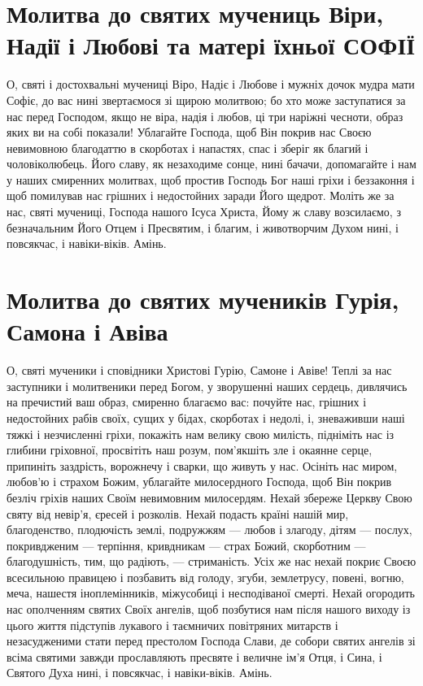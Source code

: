 \documentclass[chapters.tex]{subfiles}
\begin{document}
\section{Молитва до святих мучениць Віри, Надії і Любові та матері їхньої СОФІЇ}
О, святі і достохвальні мучениці Віро, Надіє і Любове і мужніх дочок мудра мати Софіє, до вас нині звертаємося зі щирою молитвою; бо хто може заступатися за нас перед Господом, якщо не віра, надія і любов, ці три наріжні чесноти, образ яких ви на собі показали! Ублагайте Господа, щоб Він покрив нас Своєю невимовною благодаттю в скорботах і напастях, спас і зберіг як благий і чоловіколюбець. Його славу, як незаходиме сонце, нині бачачи, допомагайте і нам у наших смиренних молитвах, щоб простив Господь Бог наші гріхи і беззаконня і щоб помилував нас грішних і недостойних заради Його щедрот. Моліть же за нас, святі мучениці, Господа нашого Ісуса Христа, Йому ж славу возсилаємо, з безначальним Його Отцем і Пресвятим, і благим, і животворчим Духом нині, і повсякчас, і навіки-віків. Амінь.

\section{Молитва до святих мучеників Гурія, Самона і Авіва}
О, святі мученики і сповідники Христові Гурію, Самоне і Авіве! Теплі за нас заступники і молитвеники перед Богом, у зворушенні наших сердець, дивлячись на пречистий ваш образ, смиренно благаємо вас: почуйте нас, грішних і недостойних рабів своїх, сущих у бідах, скорботах і недолі, і, зневаживши наші тяжкі і незчисленні гріхи, покажіть нам велику свою милість, підніміть нас із глибини гріховної, просвітіть наш розум, пом’якшіть зле і окаянне серце, припиніть заздрість, ворожнечу і сварки, що живуть у нас. Осініть нас миром, любов’ю і страхом Божим, ублагайте милосердного Господа, щоб Він покрив безліч гріхів наших Своїм невимовним милосердям. Нехай збереже Церкву Свою святу від невір’я, єресей і розколів. Нехай подасть країні нашій мир, благоденство, плодючість землі, подружжям — любов і злагоду, дітям — послух, покривдженим — терпіння, кривдникам — страх Божий, скорботним — благодушність, тим, що радіють, — стриманість. Усіх же нас нехай покриє Своєю всесильною правицею і позбавить від голоду, згуби, землетрусу, повені, вогню, меча, нашестя іноплемінників, міжусобиці і несподіваної смерті. Нехай огородить нас ополченням святих Своїх ангелів, щоб позбутися нам після нашого виходу із цього життя підступів лукавого і таємничих повітряних митарств і незасудженими стати перед престолом Господа Слави, де собори святих ангелів зі всіма святими завжди прославляють пресвяте і величне ім’я Отця, і Сина, і Святого Духа нині, і повсякчас, і навіки-віків. Амінь.
\end{document}
